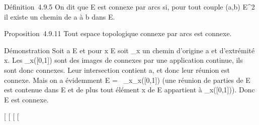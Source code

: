 \documentclass[]{article}
\begin{document}
Définition~4.9.5 On dit que E est connexe par arcs si, pour tout couple
(a,b) \in E^2 il existe un chemin de a à b dans E.

Proposition~4.9.11 Tout espace topologique connexe par arcs est connexe.

Démonstration Soit a \in E et pour x \in E soit \gamma\_x un chemin
d'origine a et d'extrémité x. Les \gamma\_x({[}0,1{]}) sont des
images de connexes par une application continue, ils sont donc connexes.
Leur intersection contient a, et donc leur réunion est connexe. Mais on
a évidemment E =\ \⋃
 \_x\inE\gamma\_x({[}0,1{]}) (une réunion de parties de E est
contenue dans E et de plus tout élément x de E appartient à
\gamma\_x({[}0,1{]})). Donc E est connexe.

{[}
{[}
{[}
{[}
\end{document}
